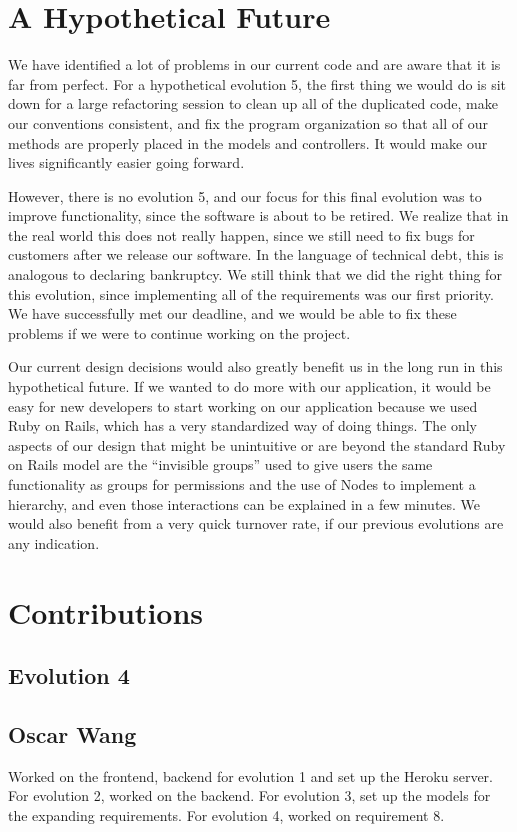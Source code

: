 \documentclass{article}
\begin{document}
\section{A Hypothetical Future}
We have identified a lot of problems in our current code and are aware that it is far from perfect.  For a hypothetical evolution 5, the first thing we would do is sit down for a large refactoring session to clean up all of the duplicated code, make our conventions consistent, and fix the program organization so that all of our methods are properly placed in the models and controllers.  It would make our lives significantly easier going forward.\par
However, there is no evolution 5, and our focus for this final evolution was to improve functionality, since the software is about to be retired.  We realize that in the real world this does not really happen, since we still need to fix bugs for customers after we release our software.  In the language of technical debt, this is analogous to declaring bankruptcy.  We still think that we did the right thing for this evolution, since implementing all of the requirements was our first priority.  We have successfully met our deadline, and we would be able to fix these problems if we were to continue working on the project.\par
Our current design decisions would also greatly benefit us in the long run in this hypothetical future.  If we wanted to do more with our application, it would be easy for new developers to start working on our application because we used Ruby on Rails, which has a very standardized way of doing things.  The only aspects of our design that might be unintuitive or are beyond the standard Ruby on Rails model are the ``invisible groups'' used to give users the same functionality as groups for permissions and the use of Nodes to implement a hierarchy, and even those interactions can be explained in a few minutes.  We would also benefit from a very quick turnover rate, if our previous evolutions are any indication.
\section{Contributions}
\subsection{Evolution 4}
\subsection{Oscar Wang}
Worked on the frontend, backend for evolution 1 and set up the Heroku server. For evolution 2, worked on the backend. For evolution 3, set up the models for the expanding requirements. For evolution 4, worked on requirement 8.
\end{document}
